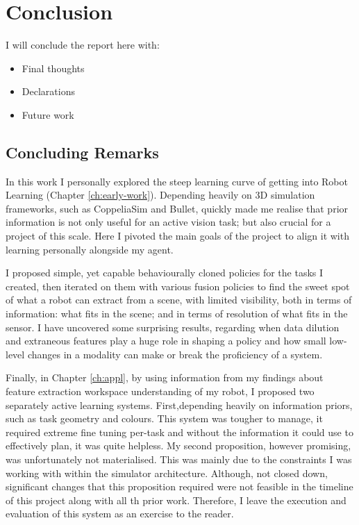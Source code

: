 \chapter{Conclusion}
I will conclude the report here with:
\begin{itemize}
  \item Final thoughts
  \item Declarations
  \item Future work
\end{itemize}

\section{Concluding Remarks}
In this work I personally explored the steep learning curve of getting into Robot Learning (Chapter \ref{ch:early-work}). Depending heavily on 3D simulation frameworks, such as CoppeliaSim and Bullet, quickly made me realise that prior information is not only useful for an active vision task; but also crucial for a project of this scale. Here I pivoted the main goals of the project to align it with learning personally alongside my agent.

I proposed simple, yet capable behaviourally cloned policies for the tasks I created, then iterated on them with various fusion policies to find the sweet spot of what a robot can extract from a scene, with limited visibility, both in terms of information: what fits in the scene; and in terms of resolution of what fits in the sensor. I have uncovered some surprising results, regarding when data dilution and extraneous features play a huge role in shaping a policy and how small low-level changes in a modality can make or break the proficiency of a system.

Finally, in Chapter \ref{ch:appl}, by using information from my findings about feature extraction workspace understanding of my robot, I proposed two separately active learning systems. First,depending heavily on information priors, such as task geometry and colours. This system was tougher to manage, it required extreme fine tuning  per-task and without the information it could use to effectively plan, it was quite helpless. My second proposition, however promising, was unfortunately not materialised. This was mainly due to the constraints I was working with within the simulator architecture. Although, not closed down, significant changes that this proposition required were not feasible in the timeline of this project along with all th prior work. Therefore, I leave the execution and evaluation of this system as an exercise to the reader.

